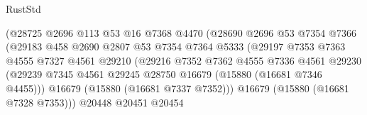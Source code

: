 \begin{lexlean}{RustStd}
\begin{coremodule}
                                        (@28725
                                          @2696
                                          @113
                                          @53
                                          @16
                                          @7368
                                          @4470
                                          (@28690
                                            @2696
                                            @53
                                            @7354
                                            @7366
                                            (@29183
                                              @458
                                              @2690
                                              @2807
                                              @53
                                              @7354
                                              @7364
                                              @5333
                                              (@29197
                                                @7353
                                                @7363
                                                @4555
                                                @7327
                                                @4561
                                                @29210
                                                (@29216
                                                  @7352
                                                  @7362
                                                  @4555
                                                  @7336
                                                  @4561
                                                  @29230
                                                  (@29239
                                                    @7345
                                                    @4561
                                                    @29245
                                                    @28750
                                                    @16679
                                                    (@15880 (@16681 @7346 @4455)))
                                                  @16679
                                                  (@15880 (@16681 @7337 @7352)))
                                                @16679
                                                (@15880 (@16681 @7328 @7353)))
                                              @20448
                                              @20451
                                              @20454

\end{coremodule}
\end{lexlean}
